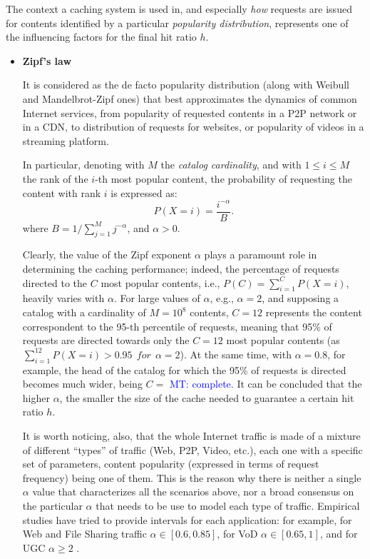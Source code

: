 \documentclass[10pt]{article}
\newcommand{\MT}[1]{\textcolor{blue}{MT: #1}}
\newcommand{\fakeacmpar}[1]{\vspace{2 mm}\noindent{\textbf{#1.}}}
\begin{document}
\fakeacmpar{Content Popularity}
The context a caching system is used in, and especially \emph{how} requests are issued for contents identified by a particular  \emph{popularity distribution}, represents one of the influencing factors for the final hit ratio $h$.
\begin{itemize}
\item \textbf{Zipf's law} 

It is considered as the de facto popularity distribution (along with Weibull and Mandelbrot-Zipf ones) that best approximates the dynamics of common Internet services, from popularity of requested contents in a P2P network or in a CDN, to distribution of requests for websites, or popularity of videos in a streaming platform. 

In particular, denoting with $M$ the \emph{catalog cardinality}, and with $1 \le i \le M$ the rank of the $i$-th most popular content, the probability of requesting the content with rank $i$ is expressed as:
\begin{equation}\label{zipf}
P(X=i)=\frac{i^{-\alpha}}{B}.
\end{equation}
where $B=1/\sum_{j=1}^M{j^{-\alpha}}$, and $\alpha > 0$. 

Clearly, the value of the Zipf exponent $\alpha$ plays a paramount role in determining the caching performance; indeed, the percentage of requests directed to the $C$ most popular contents, i.e., $P(C)=\sum_{i=1}^C{P(X=i)}$, heavily varies with $\alpha$. 
For large values of $\alpha$, e.g., $\alpha=2$, and supposing a catalog with a cardinality of $M=10^8$ contents, $C=12$ represents the content correspondent to the 95-th percentile of requests, meaning that 95\% of requests are directed towards only the $C=12$ most popular contents (as $\sum_{i=1}^{12}{P(X=i)} > 0.95 \ \ for \ \ \alpha=2$). At the same time, with $\alpha=0.8$, for example, the head of the catalog for which the 95\% of requests is directed becomes much wider, being $C=$ \MT{complete}.
It can be concluded that the higher $\alpha$, the smaller the size of the cache needed to guarantee a certain hit ratio $h$.   

It is worth noticing, also, that the whole Internet traffic is made of a mixture of different ``types'' of traffic (Web, P2P, Video, etc.), each one with a specific set of parameters, content popularity (expressed in terms of request frequency) being one of them. This is the reason why there is neither a single $\alpha$ value that characterizes all the scenarios above, nor a broad consensus on the particular $\alpha$ that needs to be use to model each type of traffic. Empirical studies have tried to provide intervals for each application: for example, for Web and File Sharing traffic $\alpha \in [0.6,0.85]$, for VoD $\alpha \in [0.65,1]$, and for UGC $\alpha \ge 2$ \cite{DraftPentikousis:16}.       
\end{itemize}
\end{document}
